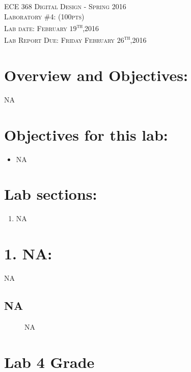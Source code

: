 \documentclass{article}
\begin{document}
\begin{center}
\textsc{\huge ECE 368 Digital Design - Spring 2016}\\[1cm]
\textsc{{\LARGE Laboratory \#4: (100pts)}}\\[0.5cm]
\textsc{\Large Lab date: February $19$\textsuperscript{th},2016}\\[0.5cm]
\textsc{\Large Lab Report Due: Friday February $26$\textsuperscript{th},2016}\\[1cm]
\end{center}

\section{Overview and Objectives:}
NA

\section{Objectives for this lab:}
\begin{itemize}
  \item NA
\end{itemize}

\section{Lab sections:}
\begin{enumerate}
  \item NA
\end{enumerate}

\newpage
\section{1. NA:}
NA

\subsection{NA}

\begin{figure}[!htbp]
  \centering
  \caption{NA}
\end{figure}

\section{Lab 4 Grade}
\end{document}
